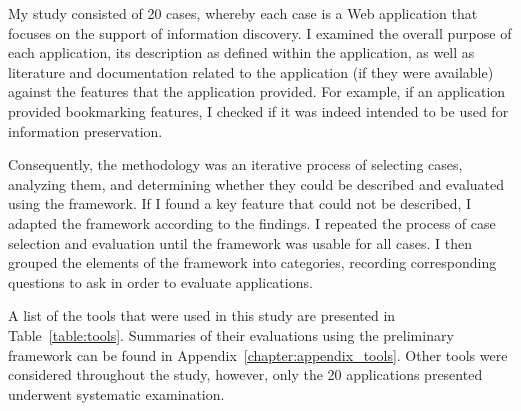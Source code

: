 {My study consisted of 20 cases, whereby each case is a Web application that focuses on the support of information discovery. I examined the overall purpose of each application, its description as defined within the application, as well as literature and documentation related to the application (if they were available) against the features that the application provided. For example, if an application provided bookmarking features, I checked if it was indeed intended to be used for information preservation. 

Consequently, the methodology was an iterative process of selecting cases, analyzing them, and determining whether they could be described and evaluated using the framework. If I found a key feature that could not be described, I adapted the framework according to the findings. I repeated the process of case selection and evaluation until the framework was usable for all cases. I then grouped the elements of the framework into categories, recording corresponding questions to ask in order to evaluate applications. 

A list of the tools that were used in this study are presented in Table~\ref{table:tools}. Summaries of their evaluations using the preliminary framework can be found in Appendix~\ref{chapter:appendix_tools}. Other tools were considered throughout the study, however, only the 20 applications presented underwent systematic examination. 

\begin{table*}[htbp]
\small
\caption{Web-based Information Discovery and Curation Tools as of May 15, 2014}
\label{table:tools} 

\begin{tabular}{|p{0.20\linewidth}| p{0.30\linewidth}| p{0.45\linewidth}|}


\end{tabular}
\end{table*}}
